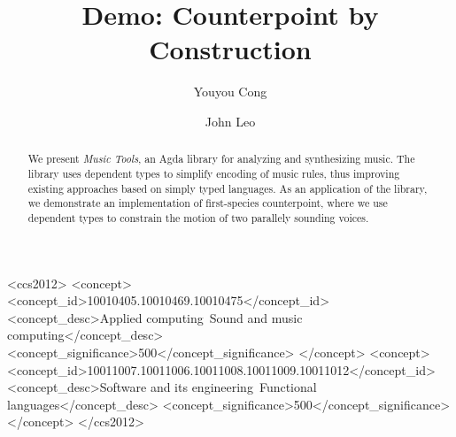 \documentclass[sigplan,10pt,screen]{acmart}
\begin{document}
\title{Demo: Counterpoint by Construction}


\author{Youyou Cong}

\author{John Leo}


\begin{abstract}
We present \emph{Music Tools}, an Agda library for analyzing 
and synthesizing music.  
The library uses dependent types to simplify encoding of 
music rules, thus improving existing approaches based on 
simply typed languages.  
As an application of the library, we demonstrate an 
implementation of first-species counterpoint, where we use
dependent types to constrain the motion of two parallely
sounding voices.
\end{abstract}


\begin{CCSXML}
<ccs2012>
<concept>
<concept_id>10010405.10010469.10010475</concept_id>
<concept_desc>Applied computing~Sound and music computing</concept_desc>
<concept_significance>500</concept_significance>
</concept>
<concept>
<concept_id>10011007.10011006.10011008.10011009.10011012</concept_id>
<concept_desc>Software and its engineering~Functional languages</concept_desc>
<concept_significance>500</concept_significance>
</concept>
</ccs2012>
\end{CCSXML}

\end{document}

